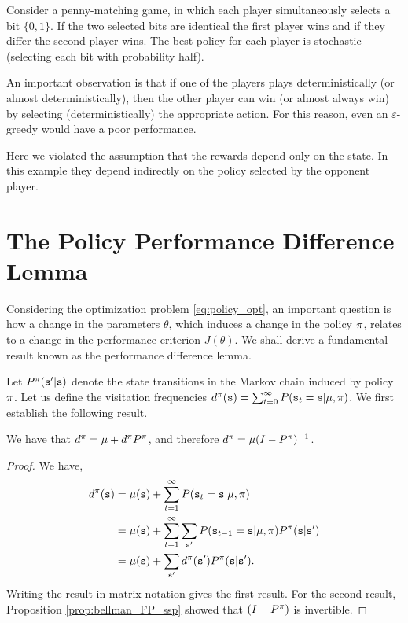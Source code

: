 
Consider a penny-matching game, in which each player simultaneously
selects a bit $\{0,1\}$. If the two selected bits are identical the
first player wins and if they differ the second player wins. The
best policy for each player is stochastic (selecting each bit with
probability half).

An important observation is that if one of the players plays
deterministically (or almost deterministically), then the other
player can win (or almost always win) by selecting
(deterministically) the appropriate action. For this reason, even
an $\varepsilon$-greedy would have a poor performance.

Here we violated the assumption that the rewards depend only on the
state. In this example they depend indirectly on the policy selected by the opponent player.

\section{The Policy Performance Difference Lemma}

Considering the optimization problem \eqref{eq:policy_opt}, an important question is how a change in the parameters $\theta$, which induces a change in the policy $\pi$, relates to a change in the performance criterion $J(\theta)$. We shall derive a fundamental result known as the performance difference lemma.

Let $P^{\pi}({\tt s}' | {\tt s})$ denote the state transitions in the Markov chain induced by policy $\pi$. Let us define the visitation frequencies $d^{\pi}({\tt s}) = \sum_{t=0}^\infty P({\tt s}_t = {\tt s} | \mu, \pi)$. We first establish the following result.
\begin{proposition}\label{prop:visitation_freq}
    We have that $d^{\pi} = \mu + d^{\pi} P^{\pi}$, and therefore $d^{\pi} = \mu (I - P^{\pi})^{-1}$.
\end{proposition}
\begin{proof}
We have,
\begin{equation*}
\begin{split}
        d^{\pi}({\tt s}) &= \mu({\tt s}) + \sum_{t=1}^\infty P({\tt s}_t = {\tt s} | \mu, \pi) \\
        &= \mu({\tt s}) + \sum_{t=1}^\infty \sum_{{\tt s}'} P({\tt s}_{t-1} = {\tt s} | \mu, \pi) P^{\pi}({\tt s} | {\tt s}')\\
        &= \mu({\tt s}) + \sum_{{\tt s}'} d^{\pi}({\tt s}')P^{\pi}({\tt s} | {\tt s}').
\end{split}
\end{equation*}
Writing the result in matrix notation gives the first result. For the second result, Proposition \ref{prop:bellman_FP_ssp} showed that $(I - P^{\pi})$ is invertible. 
\end{proof}

